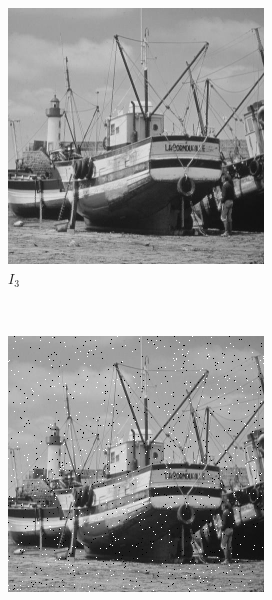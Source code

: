 \documentclass{article}
\begin{document}
\begin{enumerate}[label=(\alph*)]
\begin{figure}[!htb]
        \begin{subfigure}[b]{0.3\textwidth}
            \includegraphics[width=\textwidth]{img/I3.png}
            \caption{$I_3$}
        \end{subfigure}
        ~
        \begin{subfigure}[b]{0.3\textwidth}
            \includegraphics[width=\textwidth]{img/S1.png}

\end{subfigure}
\end{figure}
\end{enumerate}
\end{document}

